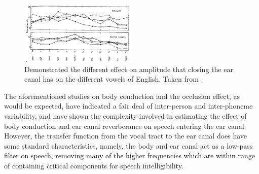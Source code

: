 \documentclass[dissertation,copyright]{uathesis}
\begin{document}
\begin{figure}
\includegraphics[width=0.5\textwidth]{figure/bekesy60-3.png}
\caption{Demonstrated the different effect on amplitude that closing the ear canal has on the different vowels of English.  Taken from \cite{bekesy:60}.}
\label{bekesyPhoneDiff}
\end{figure}


The aforementioned studies on body conduction and the occlusion effect, as would be expected, have indicated a fair deal of inter-person and inter-phoneme variability, and have shown the complexity involved in estimating the effect of body conduction and ear canal reverberance on speech entering the ear canal.  However, the transfer function from the vocal tract to the ear canal does have some standard characteristics, namely, the body and ear canal act as a low-pass filter on speech, removing many of the higher frequencies which are within range of containing critical components for speech intelligibility.



\end{document}
